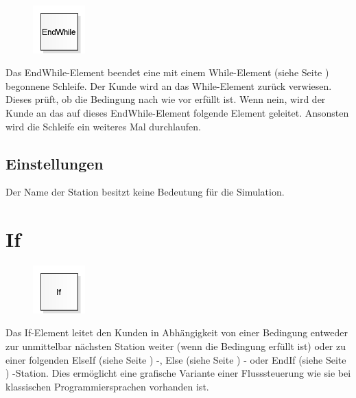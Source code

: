 \begin{figure}
\vspace{-22pt}
\includegraphics[width=2cm]{imageModelElementLogicEndWhile.png}
\vspace{-22pt}
\end{figure}

Das EndWhile-Element beendet eine mit einem
While-Element (siehe Seite \pageref{ref:ModelElementLogicWhile}) begonnene
Schleife. Der Kunde wird an das While-Element zurück verwiesen.
Dieses prüft, ob die Bedingung nach wie vor erfüllt ist.
Wenn nein, wird der Kunde an das auf dieses EndWhile-Element
folgende Element geleitet. Ansonsten wird die Schleife ein
weiteres Mal durchlaufen.

\subsection*{Einstellungen}

Der Name der Station besitzt keine Bedeutung für die Simulation.


\section{If}
\label{ref:ModelElementLogicIf}

\begin{figure}
\vspace{-22pt}
\includegraphics[width=2cm]{imageModelElementLogicIf.png}
\vspace{-22pt}
\end{figure}

Das If-Element leitet den Kunden in Abhängigkeit von einer Bedingung entweder
zur unmittelbar nächsten Station weiter (wenn die Bedingung erfüllt ist) oder
zu einer folgenden ElseIf (siehe Seite \pageref{ref:ModelElementLogicElseIf}) -,
Else (siehe Seite \pageref{ref:ModelElementLogicElse}) - oder
EndIf (siehe Seite \pageref{ref:ModelElementLogicEndIf}) -Station.
Dies ermöglicht eine grafische Variante einer Flusssteuerung wie sie bei
klassischen Programmiersprachen vorhanden ist.

